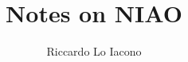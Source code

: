 \title{Notes on NIAO}
\author{Riccardo Lo Iacono}
\institute{}

% 

\usepackage{etextools}
\usepackage[ruled]{algorithm2e}
\usepackage{mathtools,amsfonts,amssymb}
\usepackage{cleveref}
\usepackage{subfiles}

\newcommand\set[2][]{\left\lbrace #2 \ifnotempty{#1}{\middle #1}{} \right\rbrace}
